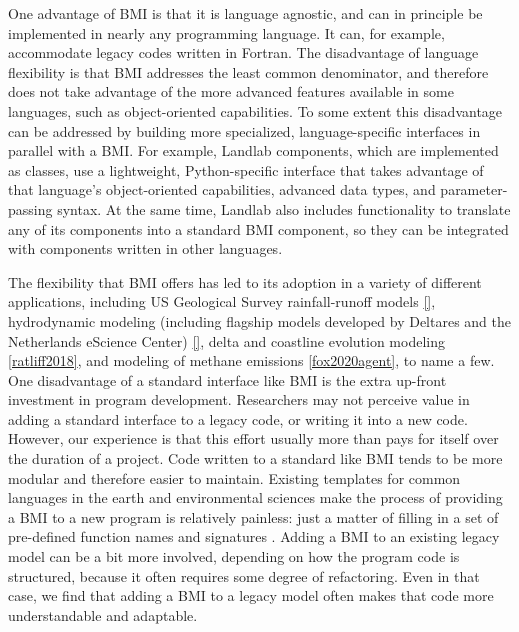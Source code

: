 \documentclass[12pt]{amsart}
\begin{document}
One advantage of BMI is that it is language agnostic, and can in principle be implemented in nearly any programming language. It can, for example, accommodate legacy codes written in Fortran. The disadvantage of language flexibility is that BMI addresses the least common denominator, and therefore does not take advantage of the more advanced features available in some languages, such as object-oriented capabilities. To some extent this disadvantage can be addressed by building more specialized, language-specific interfaces in parallel with a BMI. For example, Landlab components, which are implemented as classes, use a lightweight, Python-specific interface that takes advantage of that language's object-oriented capabilities, advanced data types, and parameter-passing syntax. At the same time, Landlab also includes functionality to translate any of its components into a standard BMI component, so they can be integrated with components written in other languages.

The flexibility that BMI offers has led to its adoption in a variety of different applications, including US Geological Survey rainfall-runoff models \ref{}, hydrodynamic modeling (including flagship models developed by Deltares and the Netherlands eScience Center) \ref{}, delta and coastline evolution modeling \ref{ratliff2018}, and modeling of methane emissions \ref{fox2020agent}, to name a few. One disadvantage of a standard interface like BMI is the extra up-front investment in program development. Researchers may not perceive value in adding a standard interface to a legacy code, or writing it into a new code. However, our experience is that this effort usually more than pays for itself over the duration of a project. Code written to a standard like BMI tends to be more modular and therefore easier to maintain. Existing templates for common languages in the earth and environmental sciences make the process of providing a BMI to a new program is relatively painless: just a matter of filling in a set of pre-defined function names and signatures \citep{hutton2020basic}. Adding a BMI to an existing legacy model can be a bit more involved, depending on how the program code is structured, because it often requires some degree of refactoring. Even in that case, we find that adding a BMI to a legacy model often makes that code more understandable and adaptable.
\end{document}
